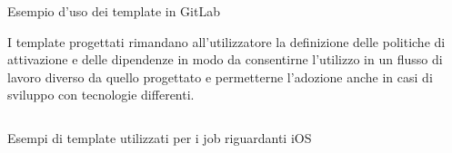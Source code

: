 \begin{listing}[H]
\inputminted{yaml}{code/4-templating}
\caption{Esempio d'uso dei template in GitLab}
\end{listing}

I template progettati rimandano all'utilizzatore la definizione delle politiche di attivazione e delle dipendenze in modo da consentirne l'utilizzo in un flusso di lavoro diverso da quello progettato e permetterne l'adozione anche in casi di sviluppo con tecnologie differenti.

\begin{listing}[H]
\inputminted{yaml}{code/4-templating2}
\caption{Esempi di template utilizzati per i job riguardanti iOS}
\end{listing}
